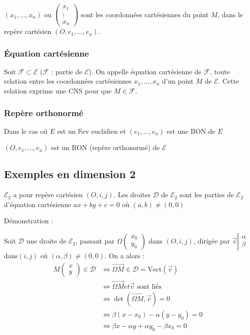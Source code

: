 \documentclass[12pt,a4paper,french]{book}
\begin{document}
				$(x_1,...,x_n)$ ou $\begin{pmatrix}
					x_1 \\ \vdots \\x_n
				\end{pmatrix}$ sont les coordonnées cartésiennes du point $M$, dans le repère cartésien $(O,e_1,...,e_n)$.
			\subsubsection{Équation cartésienne}
				Soit $\mathcal{F} \subset \mathcal{E}$ ($\mathcal{F}$ : partie de $ \mathcal{E}$).
				On appelle équation cartésienne de $\mathcal{F}$, toute relation entre les coordonnées cartésiennes $x_1,...,x_n$ d'un point $M$ de $\mathcal{E}$. Cette relation exprime une CNS pour que $M \in \mathcal{F}$.
			\subsubsection{Repère orthonormé}
				Dans le cas où $E$ est un $\mathbb{R}$ev euclidien et $(e_1,...,e_n)$ est une BON de $E$
				
				$(O,e_1,...,e_n)$ est un RON (repère orthonormé) de $\mathcal{E}$
		\subsection{Exemples en dimension 2}
			$\mathcal{E}_2$ a pour repère cartésien $(O,i,j)$. Les droites $\mathcal{D}$ de $\mathcal{E}_2$ sont les parties de $\mathcal{E}_2$ d'équation cartésienne $ax+by+c=0$ où $(a,b) \neq (0,0)$
			
			Démonstration : 
			
			 Soit $\mathcal{D}$ une droite de $\mathcal{E}_2$, passant par $\Omega \begin{pmatrix} x_0\\y_0 \end{pmatrix}$ dans $(O,i,j)$, dirigée par $\overrightarrow{v} \left| \begin{array}{ll} \alpha \\ \beta \end{array}\right.$ dans$(i,j)$ où $(\alpha,\beta) \neq (0,0)$.
			On a alors :
			\begin{equation} 
				\begin{split}
					M\begin{pmatrix} x\\y \end{pmatrix} \in \mathcal{D} & \Leftrightarrow \overrightarrow{\Omega M} \in \mathcal{D} = \mbox{Vect}(\overrightarrow{v}) \\ & \Leftrightarrow \overrightarrow{\Omega M} et \overrightarrow{v} \mbox{ sont liés} \\ & \Leftrightarrow \det(\overrightarrow{\Omega M},\overrightarrow{v})=0 \\ & \Leftrightarrow \beta(x-x_0) - \alpha(y-y_0) = 0 \\ & \Leftrightarrow \beta x- \alpha y+\alpha y_0- \beta x_0 = 0 \end{split} 
			\end{equation}
			
\end{document}
